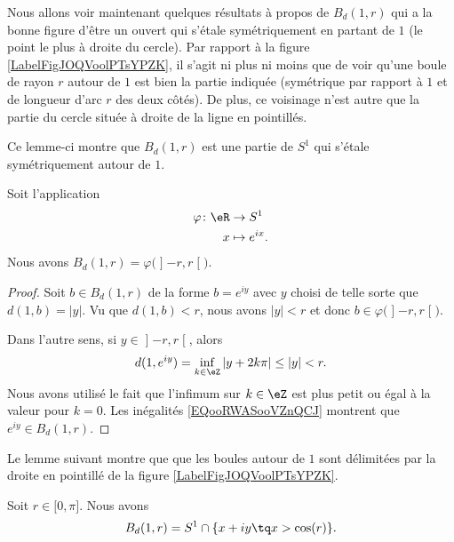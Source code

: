 Nous allons voir maintenant quelques résultats à propos de \(B_d(1,r)\) qui a la bonne figure d'être un ouvert qui s'étale symétriquement en partant de \( 1\) (le point le plus à droite du cercle). Par rapport à la figure \ref{LabelFigJOQVoolPTsYPZK}, il s'agit ni plus ni moins que de voir qu'une boule de rayon \( r\) autour de \( 1\) est bien la partie indiquée (symétrique par rapport à \( 1\) et de longueur d'arc \( r\) des deux côtés). De plus, ce voisinage n'est autre que la partie du cercle située à droite de la ligne en pointillés.
\newcommand{\CaptionFigJOQVoolPTsYPZK}{Un voisinage de \( 1\) dans \( S^1\).}


Ce lemme-ci montre que \( B_d(1,r)\) est une partie de \( S^1\) qui s'étale symétriquement autour de \( 1\).
\begin{lemma}       \label{LEMooMYNVooIWWsiV}
    Soit l'application
    \begin{equation}
        \begin{aligned}
            \varphi\colon \eR&\to S^1 \\
            x&\mapsto  e^{ix}.
        \end{aligned}
    \end{equation}
    Nous avons \( B_d(1,r)=\varphi\big( \mathopen] -r , r \mathclose[ \big)\).
\end{lemma}

\begin{proof}
    Soit \( b\in B_d(1,r)\) de la forme \( b= e^{iy}\) avec \( y\) choisi de telle sorte que \( d(1,b)=| y |\). Vu que \( d(1,b)<r\), nous avons \( | y |<r\) et donc \( b\in \varphi\big( \mathopen] -r , r \mathclose[ \big)\).

    Dans l'autre sens, si \( y\in\mathopen] -r , r \mathclose[\), alors
        \begin{equation}        \label{EQooRWASooVZnQCJ}
            d(1, e^{iy})=\inf_{k\in \eZ}| y+2k\pi |\leq | y |<r.
        \end{equation}
        Nous avons utilisé le fait que l'infimum sur \( k\in \eZ\) est plus petit ou égal à la valeur pour \( k=0\). Les inégalités \eqref{EQooRWASooVZnQCJ} montrent que \(  e^{iy}\in B_d(1,r)\).
\end{proof}

Le lemme suivant montre que que les boules autour de \( 1\) sont délimitées par la droite en pointillé de la figure \ref{LabelFigJOQVoolPTsYPZK}.
\begin{lemma}       \label{LEMooLINCooHJmJWx}
    Soit \( r\in \mathopen[ 0 , \pi \mathclose]\). Nous avons
    \begin{equation}
        B_d(1,r)=S^1\cap\{x+iy\tq x>\cos(r)\}.
    \end{equation}
\end{lemma}

